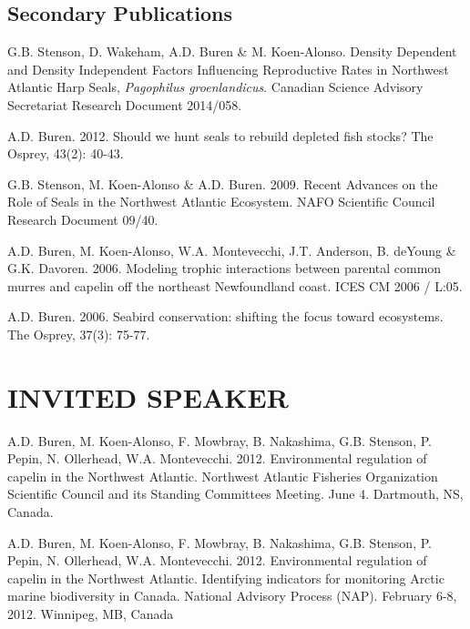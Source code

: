 \documentclass{res}
\begin{document}
\begin{resume}
\begin{hangparas}{.4in}{1}
\end{hangparas}

\subsection{Secondary Publications}
\begin{hangparas}{.4in}{1}
	
G.B. Stenson, D. Wakeham, A.D. Buren \& M. Koen-Alonso. Density Dependent and Density Independent Factors Influencing Reproductive Rates in Northwest Atlantic Harp Seals, \textit{Pagophilus groenlandicus}. Canadian Science Advisory Secretariat Research Document 	2014/058.

A.D. Buren. 2012. Should we hunt seals to rebuild depleted fish stocks? The Osprey, 43(2): 40-43.

G.B. Stenson, M. Koen-Alonso \& A.D. Buren. 2009. Recent Advances on the Role of Seals in the Northwest Atlantic Ecosystem. NAFO Scientific Council Research Document 09/40.

A.D. Buren, M. Koen-Alonso, W.A. Montevecchi, J.T. Anderson, B. deYoung \& G.K. Davoren. 2006. Modeling trophic interactions between parental common murres and capelin off the northeast Newfoundland coast. ICES CM 2006 / L:05.

A.D. Buren. 2006. Seabird conservation: shifting the focus toward ecosystems. The Osprey, 37(3): 75-77.

\end{hangparas}

\section{INVITED SPEAKER}
\vspace{0.1in} 
\begin{hangparas}{.4in}{1}
	A.D. Buren, M. Koen-Alonso, F. Mowbray, B. Nakashima, G.B. Stenson, P. Pepin, N. Ollerhead, W.A. Montevecchi. 2012. Environmental regulation of capelin in the Northwest Atlantic. Northwest Atlantic Fisheries Organization Scientific Council and its Standing Committees Meeting. June 4. Dartmouth, NS, Canada.
	
	A.D. Buren, M. Koen-Alonso, F. Mowbray, B. Nakashima, G.B. Stenson, P. Pepin, N. Ollerhead, W.A. Montevecchi. 2012. Environmental regulation of capelin in the Northwest Atlantic. Identifying indicators for monitoring Arctic marine biodiversity in Canada. National Advisory Process (NAP). February 6-8, 2012. Winnipeg, MB, Canada
\end{hangparas}	


\end{resume}
\end{document}
